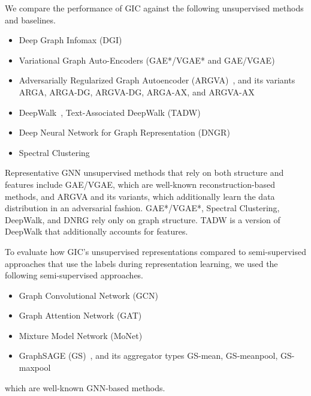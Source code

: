 \documentclass{article}
\begin{document}
We compare the performance of GIC against the following unsupervised methods and baselines.
\begin{itemize}
    \item Deep Graph Infomax (DGI)~\cite{velickovic2018deep}
    \item Variational Graph Auto-Encoders (GAE*/VGAE* and GAE/VGAE)~\cite{kipf2016variational}
    \item Adversarially Regularized Graph Autoencoder (ARGVA)~\cite{pan2019learning}, and its variants ARGA, ARGA-DG, ARGVA-DG, ARGA-AX, and ARGVA-AX
    \item DeepWalk~\cite{perozzi2014deepwalk}, Text-Associated DeepWalk (TADW)~\cite{yang2015network}
    \item Deep Neural Network for Graph Representation (DNGR)~\cite{cao2016deep}
    \item Spectral Clustering~\cite{tang2011leveraging}
\end{itemize}
Representative GNN unsupervised methods that rely on both structure and features include GAE/VGAE, which are well-known reconstruction-based methods, and ARGVA and its variants, which additionally learn the data distribution in an adversarial fashion. GAE*/VGAE*, Spectral Clustering, DeepWalk, and DNRG rely only on graph structure. TADW is a version of DeepWalk that additionally accounts for features.

To evaluate how GIC's unsupervised representations compared to semi-supervised approaches that use the labels during representation learning, we used the following semi-supervised approaches. 
\begin{itemize}
    \item Graph Convolutional Network (GCN)~\cite{kipf2016semi}
    \item Graph Attention Network (GAT)~\cite{velickovic2018graph}
    \item Mixture Model Network (MoNet)~\cite{monti2017geometric} 
    \item GraphSAGE (GS)~\cite{hamilton2017inductive}, and its aggregator types GS-mean, GS-meanpool, GS-maxpool
\end{itemize}
which are well-known GNN-based methods.
\end{document}
